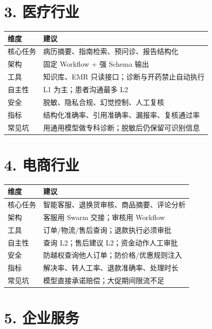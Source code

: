 \documentclass[9pt,a4paper,twocolumn]{ctexart}
\begin{document}
\section*{3. 医疗行业}

{\footnotesize
\begin{tabular}{|p{}|p{}|}
\hline
\textbf{维度} & \textbf{建议} \\
\hline
核心任务 & 病历摘要、指南检索、预问诊、报告结构化 \\
\hline
架构 & 固定 Workflow + 强 Schema 输出 \\
\hline
工具 & 知识库、EMR 只读接口；诊断与开药禁止自动执行 \\
\hline
自主性 & L1 为主；患者沟通最多 L2 \\
\hline
安全 & 脱敏、隐私合规、幻觉控制、人工复核 \\
\hline
指标 & 结构化准确率、引用准确率、漏报率、复核通过率 \\
\hline
常见坑 & 用通用模型做专科诊断；脱敏后仍保留可识别信息 \\
\hline
\end{tabular}
}



\section*{4. 电商行业}

{\footnotesize
\begin{tabular}{|p{}|p{}|}
\hline
\textbf{维度} & \textbf{建议} \\
\hline
核心任务 & 智能客服、退换货审核、商品摘要、评论分析 \\
\hline
架构 & 客服用 Swarm 交接；审核用 Workflow \\
\hline
工具 & 订单/物流/售后查询；退款执行必须审批 \\
\hline
自主性 & 查询 L2；售后建议 L2；资金动作人工审批 \\
\hline
安全 & 防越权查询他人订单；防价格/优惠规则注入 \\
\hline
指标 & 解决率、转人工率、退款准确率、处理时长 \\
\hline
常见坑 & 模型直接承诺赔偿；大促期间限流不足 \\
\hline
\end{tabular}
}



\section*{5. 企业服务}
\end{document}
